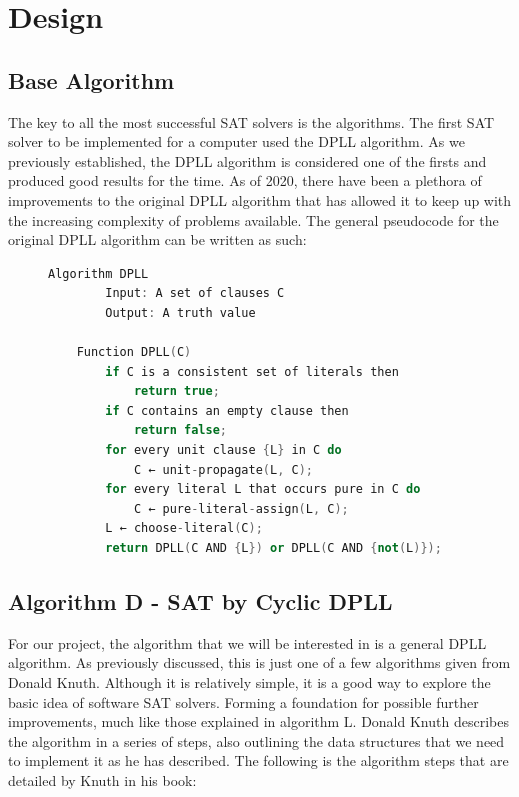 \documentclass{article}
\begin{document}
\section{Design}

\subsection{Base Algorithm}
The key to all the most successful SAT solvers is the algorithms. The first SAT solver to be implemented for a computer used the DPLL algorithm. As we previously established, the DPLL algorithm is considered one of the firsts and produced good results for the time. As of 2020, there have been a plethora of improvements to the original DPLL algorithm that has allowed it to keep up with the increasing complexity of problems available. The general pseudocode for the original DPLL algorithm can be written as such:

\begin{figure}[h]
\begin{lstlisting}[language=C++]
    Algorithm DPLL
        Input: A set of clauses C
        Output: A truth value

    Function DPLL(C)
        if C is a consistent set of literals then
            return true;
        if C contains an empty clause then
            return false;
        for every unit clause {L} in C do
            C ← unit-propagate(L, C);
        for every literal L that occurs pure in C do
            C ← pure-literal-assign(L, C);
        L ← choose-literal(C);
        return DPLL(C AND {L}) or DPLL(C AND {not(L)});
\end{lstlisting}
\end{figure}

\subsection{Algorithm D - SAT by Cyclic DPLL}
\lipsum[1-5]

For our project, the algorithm that we will be interested in is a general DPLL algorithm. As
previously discussed, this is just one of a few algorithms given from Donald Knuth. Although it is
relatively simple, it is a good way to explore the basic idea of software SAT solvers. Forming a
foundation for possible further improvements, much like those explained in algorithm L. Donald Knuth
describes the algorithm in a series of steps, also outlining the data structures that we need to
implement it as he has described. The following is the algorithm steps that are detailed by Knuth in his book:
\end{document}
